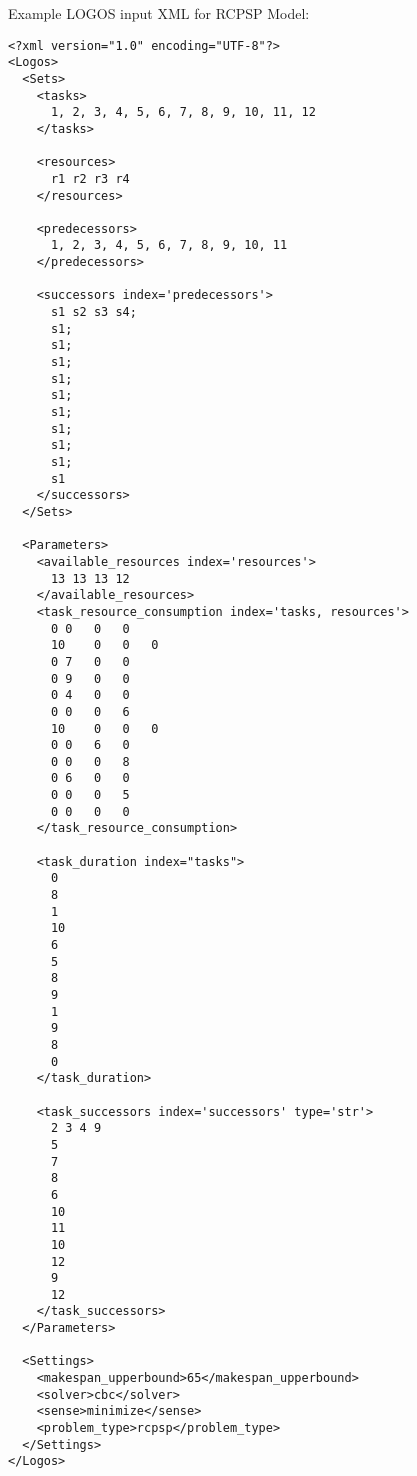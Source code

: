 Example LOGOS input XML for RCPSP Model:
\begin{lstlisting}[style=XML]
<?xml version="1.0" encoding="UTF-8"?>
<Logos>
  <Sets>
    <tasks>
      1, 2, 3, 4, 5, 6, 7, 8, 9, 10, 11, 12
    </tasks>

    <resources>
      r1 r2 r3 r4
    </resources>

    <predecessors>
      1, 2, 3, 4, 5, 6, 7, 8, 9, 10, 11
    </predecessors>

    <successors index='predecessors'>
      s1 s2 s3 s4;
      s1;
      s1;
      s1;
      s1;
      s1;
      s1;
      s1;
      s1;
      s1;
      s1
    </successors>
  </Sets>

  <Parameters>
    <available_resources index='resources'>
      13 13 13 12
    </available_resources>
    <task_resource_consumption index='tasks, resources'>
      0	0	0	0
      10	0	0	0
      0	7	0	0
      0	9	0	0
      0	4	0	0
      0	0	0	6
      10	0	0	0
      0	0	6	0
      0	0	0	8
      0	6	0	0
      0	0	0	5
      0	0	0	0
    </task_resource_consumption>

    <task_duration index="tasks">
      0
      8
      1
      10
      6
      5
      8
      9
      1
      9
      8
      0
    </task_duration>

    <task_successors index='successors' type='str'>
      2 3 4 9
      5
      7
      8
      6
      10
      11
      10
      12
      9
      12
    </task_successors>
  </Parameters>

  <Settings>
    <makespan_upperbound>65</makespan_upperbound>
    <solver>cbc</solver>
    <sense>minimize</sense>
    <problem_type>rcpsp</problem_type>
  </Settings>
</Logos>
\end{lstlisting}
